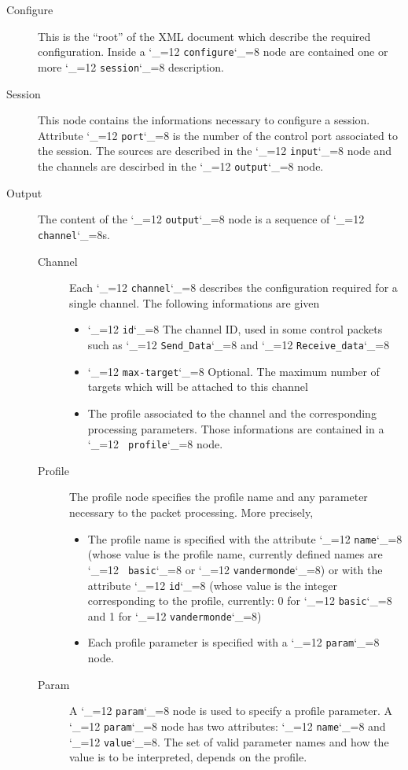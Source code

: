 \documentclass{rfc}
\def\ttt{\catcode`\_=12 \tttii}
\def\tttii#1!{{\tt #1}\catcode`\_=8{}}
\begin{document}
\begin{description}
\item[Configure] This is the ``root'' of the XML document which
  describe the required configuration.  Inside a \ttt configure! node
  are contained one or more \ttt session! description.
\item[Session] This node contains the informations necessary to
  configure a session.  Attribute \ttt port! is the number of the
  control port associated to the session.  The sources are described
  in the \ttt input! node and the channels are descirbed in the \ttt output!
  node. 
\item[Output] The content of the \ttt output! node is a sequence of
  \ttt channel!s.
\begin{description}
\item[Channel] Each \ttt channel! describes the configuration required
  for a single channel.  The following informations are given 
  \begin{itemize}
    \item \ttt id! The channel ID, used in some control packets such
    as  \ttt Send_Data! and \ttt Receive_data!
    \item \ttt max-target! Optional.  The maximum number of targets
    which will be attached to this channel
    \item The profile associated to the channel and the corresponding
    processing parameters.  Those informations are contained in a \ttt
    profile! node.
  \end{itemize}
\item[Profile] The profile node specifies the profile name and any
  parameter necessary to the packet processing.  More precisely,
  \begin{itemize}
    \item The profile name is specified with the attribute \ttt name!
    (whose value is the profile name, currently defined names are \ttt
    basic! or \ttt vandermonde!) or with the attribute \ttt id! (whose
    value is the integer corresponding to the profile, currently: 0
    for \ttt basic! and 1 for \ttt vandermonde!)
    \item Each profile parameter is specified with a \ttt param! node.
  \end{itemize}
\item[Param] A \ttt param! node is used to specify a profile
  parameter. A \ttt param! node has two attributes: \ttt name! and
  \ttt value!.  The set of valid parameter names and how the value is
  to be interpreted, depends on the profile.

\end{description}
\end{description}
\end{document}
